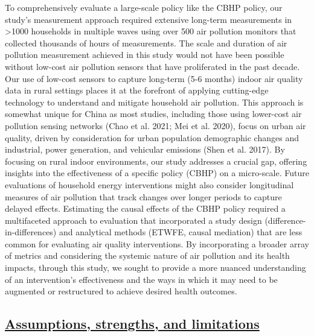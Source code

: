 \documentclass[
  letterpaper,
  DIV=11,
  numbers=noendperiod]{scrartcl}
\providecommand{\DIFadd}[1]{{\protect\color{blue}\underline{#1}}} %
\providecommand{\DIFaddbegin}{} %
\providecommand{\DIFaddend}{} %
\providecommand{\DIFdelbegin}{} %
\providecommand{\DIFdelend}{} %
\newcommand{\DIFscaledelfig}{0.5}
\newlength{\DIFdelgraphicswidth} %
\newlength{\DIFdelgraphicsheight} %
\newcommand{\DIFaddincludegraphics}[2][]{{\color{blue}\fbox{\DIFOincludegraphics[#1]{#2}}}} %
\newcommand{\DIFdelincludegraphics}[2][]{%
\sbox{\DIFdelgraphicsbox}{\DIFOincludegraphics[#1]{#2}}%
\settoboxwidth{\DIFdelgraphicswidth}{\DIFdelgraphicsbox} %
\settoboxtotalheight{\DIFdelgraphicsheight}{\DIFdelgraphicsbox} %
\scalebox{\DIFscaledelfig}{%
\parbox[b]{\DIFdelgraphicswidth}{\usebox{\DIFdelgraphicsbox}\\[-\baselineskip] \rule{\DIFdelgraphicswidth}{0em}}\llap{\resizebox{\DIFdelgraphicswidth}{\DIFdelgraphicsheight}{%
\setlength{\unitlength}{\DIFdelgraphicswidth}%
\begin{picture}(1,1)%
\thicklines\linethickness{2pt} %
{\color[rgb]{1,0,0}\put(0,0){\framebox(1,1){}}}%
{\color[rgb]{1,0,0}\put(0,0){\line( 1,1){1}}}%
{\color[rgb]{1,0,0}\put(0,1){\line(1,-1){1}}}%
\end{picture}%
}\hspace*{3pt}}} %
} %
\DeclareRobustCommand{\DIFaddbegin}{\DIFOaddbegin \let\includegraphics\DIFaddincludegraphics} %
\DeclareRobustCommand{\DIFaddend}{\DIFOaddend \let\includegraphics\DIFOincludegraphics} %
\DeclareRobustCommand{\DIFdelbegin}{\DIFOdelbegin \let\includegraphics\DIFdelincludegraphics} %
\DeclareRobustCommand{\DIFdelend}{\DIFOaddend \let\includegraphics\DIFOincludegraphics} %
\begin{document}
To comprehensively evaluate a large-scale policy like the CBHP policy,
our study's measurement approach required extensive long-term
measurements in \textgreater1000 households in multiple waves using over
500 air pollution monitors that collected thousands of hours of
measurements. The scale and duration of air pollution measurement
achieved in this study would not have been possible without low-cost air
pollution sensors that have proliferated in the past decade. Our use of
low-cost sensors to capture long-term (5-6 months) indoor air quality
data in rural settings places it at the forefront of applying
cutting-edge technology to understand and mitigate household air
pollution. This approach is somewhat unique for China as most studies,
including those using lower-cost air pollution sensing networks (Chao et
al. 2021; Mei et al. 2020), focus on urban air quality, driven by
consideration for urban population demographic changes and industrial,
power generation, and vehicular emissions (Shen et al. 2017). By
focusing on rural indoor environments, our study addresses a crucial
gap, offering insights into the effectiveness of a specific policy
(CBHP) on a micro-scale. Future evaluations of household energy
interventions might also consider longitudinal measures of air pollution
that track changes over longer periods to capture delayed effects.
Estimating the causal effects of the CBHP policy required a multifaceted
approach to evaluation that incorporated a study design
(difference-in-differences) and analytical methods (ETWFE, causal
mediation) that are less common for evaluating air quality
interventions. By incorporating a broader array of metrics and
considering the systemic nature of air pollution and its health impacts,
through this study, we sought to provide a more nuanced understanding of
an intervention's effectiveness and the ways in which it may need to be
augmented or restructured to achieve desired health outcomes.

\DIFdelbegin %
\DIFdelend \DIFaddbegin \subsection{\DIFadd{Assumptions, strengths, and
limitations}}\label{assumptions-strengths-and-limitations}
\DIFaddend 
\end{document}
